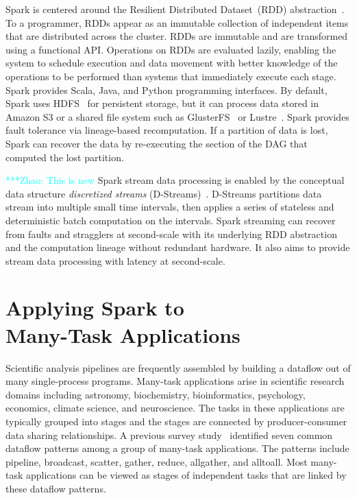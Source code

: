 \documentclass[10pt,journal,compsoc]{IEEEtran}
\newcommand{\zhaonote}[1]{{\textcolor{cyan}    { ***Zhao:      #1 }}}
\newcommand{\zhaonote}[1]{}
\begin{document}
Spark is centered around the Resilient Distributed Dataset~(RDD) abstraction~\cite{zaharia12}.
To a programmer, RDDs appear as an immutable collection of independent items that are 
distributed across the cluster. RDDs are immutable and are transformed using a
functional API. Operations on RDDs are evaluated lazily, enabling the system to schedule 
execution and data movement with better knowledge of the operations to be performed than 
systems that immediately execute each stage. Spark provides Scala, Java, and Python programming interfaces.
By default, Spark uses HDFS~\cite{shvachko10} for persistent storage, but
it can process data stored in Amazon S3 or a shared file system such as
GlusterFS~\cite{davies13} or Lustre~\cite{donovan03}. Spark provides fault tolerance via
lineage-based recomputation. If a partition of data is lost, Spark can recover the data
by re-executing the section of the DAG that computed the lost partition.

\zhaonote{This is new}
Spark stream data processing is enabled by the conceptual data structure {\it discretized streams} (D-Streams)~\cite{zaharia13}.
D-Streams partitions data stream into multiple small time intervals, then applies a series of stateless and deterministic batch computation
on the intervals.
Spark streaming can recover from faults and stragglers at second-scale with its underlying RDD abstraction and the computation lineage
without redundant hardware.
It also aims to provide stream data processing with latency at second-scale.

\section{Applying Spark to \\ Many-Task Applications}
\label{sec:Capability}

Scientific analysis pipelines are frequently assembled by building a dataflow out of many
single-process programs. Many-task applications arise in scientific research
domains including astronomy, biochemistry, bioinformatics, psychology, economics, climate science,
and neuroscience. The tasks in these applications are typically grouped into stages and the stages are connected by
producer-consumer data sharing relationships. 
A previous survey study~\cite{katz11} identified
seven common dataflow patterns among a group of many-task applications. The patterns
include pipeline, broadcast, scatter, gather,
reduce, allgather, and alltoall. Most many-task applications
can be viewed as stages of independent tasks that are linked by these dataflow patterns.
\end{document}
